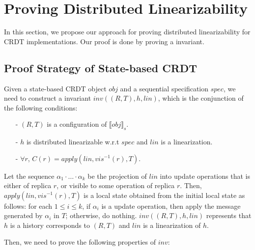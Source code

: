 
\section{Proving Distributed Linearizability}
\label{sec:proving distributed linearizability} 

In this section, we propose our approach for proving distributed linearizability for CRDT implementations. Our proof is done by proving a invariant. 


\subsection{Proof Strategy of State-based CRDT}
\label{subsec:proof strategy of operation-based CRDT} 

Given a state-based CRDT object $\mathit{obj}$ and a sequential specification $\mathit{spec}$, we need to construct a invariant $\mathit{inv}((R, T), h, \mathit{lin})$, which is the conjunction of the following conditions:    

\begin{itemize}
\setlength{\itemsep}{0.5pt}
\item[-] $(R, T)$ is a configuration of $\llbracket \mathit{obj} \rrbracket_s$.
\item[-] $h$ is distributed linearizable w.r.t $\mathit{spec}$ and $\mathit{lin}$ is a linearization.  
\item[-] $\forall r$, $C(r) = \mathit{apply}(\mathit{lin},\mathit{vis}^{-1}(r),T)$.  
\end{itemize} 

Let the sequence $\alpha_1 \cdot \ldots \cdot \alpha_k$ be the projection of $\mathit{lin}$ into update operations that is either of replica $r$, or visible to some operation of replica $r$. Then, $\mathit{apply}(\mathit{lin},\mathit{vis}^{-1}(r),T)$ is a local state obtained from the initial local state as follows: for each $1 \leq i \leq k$, if $\alpha_i$ is a update operation, then apply the message generated by $\alpha_i$ in $T$; otherwise, do nothing. $\mathit{inv}((R, T),h,\mathit{lin})$ represents that $h$ is a history corresponds to $(R,T)$ and $\mathit{lin}$ is a linearization of $h$. 

Then, we need to prove the following properties of $\mathit{inv}$: 

